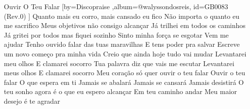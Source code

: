 \beginsong
{Ouvir O Teu Falar %
}[by={Discopraise %
},album={@walyssondosreis},
id={GB0083 %
(Rev.0) %
}]
\beginverse*
Quanto mais eu corro, mais cansado eu fico
Não importa o quanto eu me sacrifico
Meus objetivos não consigo alcançar
Já trilhei em todos os caminhos
Já gritei por todos mas fiquei sozinho
Sinto minha força se esgotar
Vem me ajudar
\endverse
\beginverse*
Tenho ouvido falar das tuas maravilhas
E tens poder pra salvar
Escreve um novo começo pra minha vida
Creio que ainda hoje tudo vai mudar
\endverse
\beginchorus
Levantarei meu olhos
E clamarei socorro
Tua palavra diz que vais me escutar
Levantarei meus olhos
E clamarei socorro
Meu coração só quer ouvir o teu falar
Ouvir o teu falar
\endchorus
\beginverse*
O que espera em ti
Jamais se abalará
Jamais se cansará
Jamais desistirá
O teu sonho agora é o que eu espero alcançar
Em teu caminho andar
Meu maior desejo é te agradar
\endverse

